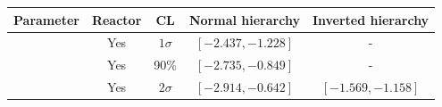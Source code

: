 \begin{tabular}{| c | c | c | c | c |}
\hline
Parameter & Reactor & CL & Normal hierarchy & Inverted hierarchy \\
\hline
\deltacp		& Yes & $ 1\sigma $ & $\left[ -2.437, -1.228 \right]$ & - \\
\deltacp		& Yes & 90\% & $\left[ -2.735, -0.849 \right]$ & - \\
\deltacp		& Yes & $ 2\sigma $ & $\left[ -2.914, -0.642 \right]$ & $\left[ -1.569, -1.158 \right]$ \\
\hline
\end{tabular}
